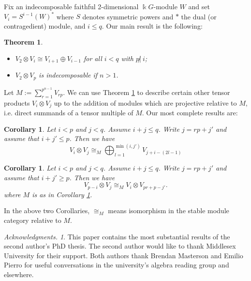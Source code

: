\documentclass[a4paper]{amsart}
\newcommand{\kk}{\Bbbk}
\newtheorem{Theorem}[Lemma]{Theorem}
\newtheorem{Corollary}[Lemma]{Corollary}
\theoremstyle{definition}
\theoremstyle{remark}
\theoremstyle{Acknowledgments}
\newtheorem{ack}{Acknowledgments.}
\begin{document}
Fix an indecomposable faithful 2-dimensional $\kk G$-module $W$ and set $V_i = S^{i-1}(W)^*$ where $S$ denotes symmetric powers and $*$ the dual (or contragedient) module, and $i\leq q$. Our main result is the following:

\begin{Theorem}\label{tensorformula}\

\begin{itemize}
\item[(a)]$V_2 \otimes V_i \cong V_{i+1} \oplus V_{i-1}$ for all $i<q$ with $p \not | \ i$;

\item[(b)] $V_2 \otimes V_p$ is indecomposable if $n>1$.
\end{itemize}
\end{Theorem}
 
Let $M:= \sum_{r=1}^{p^{n-1}}V_{rp}$. We can use Theorem \ref{tensorformula} to describe certain other tensor products $V_i \otimes V_j$ up to the addition of modules which are projective relative to $M$, i.e. direct summands of a tensor multiple of $M$. Our most complete results are:

\begin{Corollary}\label{newtensorformula}
Let $i<p$ and $j<q$. Assume $i+j \leq q$. Write $j = rp+ j'$ and assume that $i+j' \leq p$. Then we have
\begin{equation}\label{newtensorbyVj} V_i \otimes V_j \cong_M \bigoplus_{l=1}^{\min(i,j')} V_{j+i-(2l-1)}\end{equation}
\end{Corollary}

\begin{Corollary}\label{newtensorbyVp-j}
Let $i<p$ and $j<q$. Assume $i+j \leq q$. Write $j = rp+ j'$ and assume that $i+j' \geq p$. Then we have
\[V_{p-i} \otimes V_{j} \cong_M V_i \otimes V_{pr+p-j'}.\] where $M$ is as in Corollary \ref{newtensorformula}.
\end{Corollary}

In the above two Corollaries, $\cong_M$ means isomorphism in the stable module category relative to $M$.

\begin{ack}
This paper contains the most substantial results of the second author's PhD thesis. The second author would like to thank Middlesex University for their support. Both authors thank Brendan Masterson and Emilio Pierro for useful conversations in the university's algebra reading group and elsewhere.
\end{ack}
\end{document}
